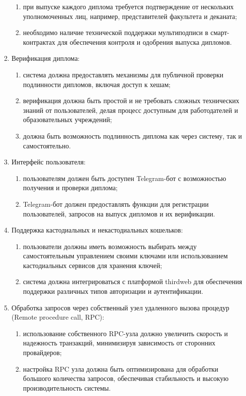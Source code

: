 \begin{enumerate}
    \begin{enumerate}
        \item при выпуске каждого диплома требуется подтверждение от нескольких уполномоченных лиц, например, представителей факультета и деканата;
        \item необходимо наличие технической поддержки мультиподписи в смарт-контрактах для обеспечения контроля и одобрения выпуска дипломов.
    \end{enumerate}
    \item Верификация диплома:
    \begin{enumerate}
        \item система должна предоставлять механизмы для публичной проверки подлинности дипломов, включая доступ к хешам;
        \item верификация должна быть простой и не требовать сложных технических знаний от пользователей, делая процесс доступным для работодателей и образовательных учреждений;
        \item должна быть возможность подлинность диплома как через систему, так и самостоятельно.
    \end{enumerate}
    \item Интерфейс пользователя:
    \begin{enumerate}
        \item пользователям должен быть доступен Telegram-бот с возможностью получения и проверки диплома;
        \item Telegram-бот должен предоставлять функции для регистрации пользователей, запросов на выпуск дипломов и их верификации.
    \end{enumerate}
    \item Поддержка кастодиальных и некастодиальных кошельков:
    \begin{enumerate}
        \item пользователи должны иметь возможность выбирать между самостоятельным управлением своими ключами или использованием кастодиальных сервисов для хранения ключей;
        \item система должна интегрироваться с платформой thirdweb для обеспечения поддержки различных типов авторизации и аутентификации.
    \end{enumerate}
    \item Обработка запросов через собственный узел удаленного вызова процедур (Remote procedure call, RPC):
    \begin{enumerate}
        \item использование собственного RPC-узла должно увеличить скорость и надежность транзакций, минимизируя зависимость от сторонних провайдеров;
        \item настройка RPC узла должна быть оптимизирована для обработки большого количества запросов, обеспечивая стабильность и высокую производительность системы.
    \end{enumerate}
\end{enumerate}

